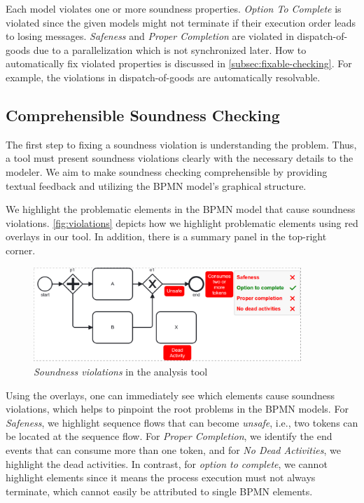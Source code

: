 \documentclass[runningheads]{llncs}
\begin{document}
Each model violates one or more soundness properties.
\textit{Option To Complete} is violated since the given models might not terminate if their execution order leads to losing messages.
\textit{Safeness} and \textit{Proper Completion} are violated in \textsf{dispatch-of-goods} due to a parallelization which is not synchronized later.
How to automatically fix violated properties is discussed in \autoref{subsec:fixable-checking}.
For example, the violations in \textsf{dispatch-of-goods} are automatically resolvable.

\subsection{Comprehensible Soundness Checking}

The first step to fixing a soundness violation is understanding the problem.
Thus, a tool must present soundness violations clearly with the necessary details to the modeler.
We aim to make soundness checking comprehensible by providing textual feedback and utilizing the BPMN model's graphical structure.

We highlight the problematic elements in the BPMN model that cause soundness violations.
\autoref{fig:violations} depicts how we highlight problematic elements using red overlays in our tool.
In addition, there is a summary panel in the top-right corner.

\begin{figure}[ht]
	\centering
	\includegraphics[width=0.9\textwidth]{images/violations}
	\caption{\textit{Soundness violations} in the analysis tool}
	\label{fig:violations}
\end{figure}

Using the overlays, one can immediately see which elements cause soundness violations, which helps to pinpoint the root problems in the BPMN models.
For \textit{Safeness}, we highlight sequence flows that can become \textit{unsafe}, i.e., two tokens can be located at the sequence flow.
For \textit{Proper Completion}, we identify the end events that can consume more than one token, and for \textit{No Dead Activities}, we highlight the dead activities.
In contrast, for \textit{option to complete}, we cannot highlight elements since it means the process execution must not always terminate, which cannot easily be attributed to single BPMN elements.
\end{document}
